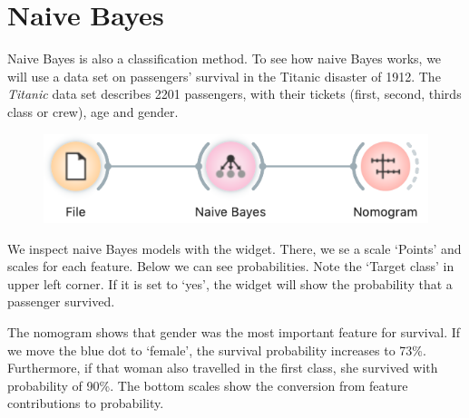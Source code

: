 \chapter{Naive Bayes}
\label{ch:naive_bayes}

Naive Bayes  is also a classification method. To see how naive Bayes works, we will use a data set on passengers’ survival in the Titanic disaster of 1912. The \textit{Titanic} data set describes 2201 passengers, with their tickets (first, second, thirds class or crew), age and gender.

\begin{figure}[h]
    \centering
    \vspace{-0.2cm}
    \includegraphics[scale=0.4]{workflow.png}
\end{figure}

We inspect naive Bayes models with the  widget. There, we se a scale ‘Points’ and scales for each feature. Below we can see probabilities. Note the ‘Target class’ in upper left corner. If it is set to ‘yes’, the widget will show the probability that a passenger survived.

The nomogram shows that gender was the most important feature for survival. If we move the blue dot to ‘female’, the survival probability increases to 73\%. Furthermore, if that woman also travelled in the first class, she survived with probability of 90\%. The bottom scales show the conversion from feature contributions to probability.

